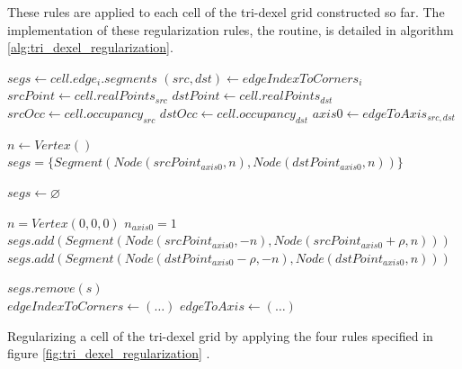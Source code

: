 These rules are applied to each cell of the tri-dexel grid constructed so far.
The implementation of these regularization rules, \ie the  routine, is detailed in algorithm \ref{alg:tri_dexel_regularization}.
%
\begin{algorithm}
	\centering
	\begin{algorithmic}[1]
				\State $segs \gets cell.edge_i.segments$ 
				\State $(src, dst) \gets edgeIndexToCorners_i$
				\State $srcPoint \gets cell.realPoints_{src}$
				\State $dstPoint \gets cell.realPoints_{dst}$
				\State $srcOcc \gets cell.occupancy_{src}$
				\State $dstOcc \gets cell.occupancy_{dst}$
				\State $axis0 \gets edgeToAxis_{src, dst}$
				
					\State $n \gets Vertex()$ 
					\State $segs = \{ Segment(Node(srcPoint_{axis0}, n), Node(dstPoint_{axis0}, n)) \}$
				\EndIf
				
					\State $segs \gets \varnothing$
				\EndIf
				
				\State $n = Vertex(0, 0, 0)$
				\State $n_{axis0} = 1$
						\State $segs.add(Segment(Node(srcPoint_{axis0}, -n), Node(srcPoint_{axis0} + \rho, n)))$
					\EndIf
				\EndIf
						\State $segs.add(Segment(Node(dstPoint_{axis0} - \rho, -n), Node(dstPoint_{axis0}, n)))$
					\EndIf
				\EndIf
				
						\State $segs.remove(s)$
					\EndIf
				\EndFor
			\EndFor
		\EndFunction
		\\
		\State $edgeIndexToCorners \gets (\dots)$
		\State $edgeToAxis \gets (\dots)$
	\end{algorithmic}
	\caption{
		Regularizing a cell of the tri-dexel grid by applying the four rules specified in figure \ref{fig:tri_dexel_regularization} \cite{tridexel_reconstruction}.
	}
	\label{alg:tri_dexel_regularization}
\end{algorithm}
%

